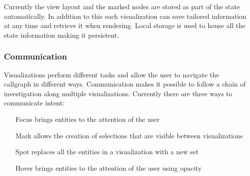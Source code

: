 Currently the view layout and the marked nodes are stored as part of the state
automatically. In addition to this each visualization can save tailored
information at any time and retrieve it when rendering. Local storage is used
to house all the state information making it persistent.

\subsubsection{Communication}

Visualizations perform different tasks and allow the user to navigate the
callgraph in different ways. Communication makes it possible to follow a chain
of investigation along multiple visualizations. Currently there are three ways
to communicate intent:

\begin{itemize}
	\item[Focus] brings entities to the attention of the user
	\item[Mark] allows the creation of selections that are visible between
visualizations
	\item[Spot] replaces all the entities in a visualization with a new set
	\item[Hover] brings entities to the attention of the user using opacity
\end{itemize}